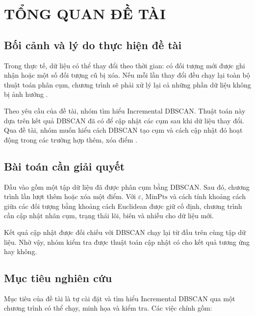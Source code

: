 \chapter{TỔNG QUAN ĐỀ TÀI}

\section{Bối cảnh và lý do thực hiện đề tài}

Trong thực tế, dữ liệu có thể thay đổi theo thời gian: có đối tượng mới được ghi nhận hoặc một số đối tượng cũ bị xóa. Nếu mỗi lần thay đổi đều chạy lại toàn bộ thuật toán phân cụm, chương trình sẽ phải xử lý lại cả những phần dữ liệu không bị ảnh hưởng \parencite{ester1998incrementaldbscan}.

Theo yêu cầu của đề tài, nhóm tìm hiểu Incremental DBSCAN. Thuật toán này dựa trên kết quả DBSCAN đã có để cập nhật các cụm sau khi dữ liệu thay đổi. Qua đề tài, nhóm muốn hiểu cách DBSCAN tạo cụm và cách cập nhật đó hoạt động trong các trường hợp thêm, xóa điểm \parencite{ester1998incrementaldbscan}.

\section{Bài toán cần giải quyết}

Đầu vào gồm một tập dữ liệu đã được phân cụm bằng DBSCAN. Sau đó, chương trình lần lượt thêm hoặc xóa một điểm. Với \(\varepsilon\), \(\mathrm{MinPts}\) và cách tính khoảng cách giữa các đối tượng bằng khoảng cách Euclidean được giữ cố định, chương trình cần cập nhật nhãn cụm, trạng thái lõi, biên và nhiễu cho dữ liệu mới.

Kết quả cập nhật được đối chiếu với DBSCAN chạy lại từ đầu trên cùng tập dữ liệu. Nhờ vậy, nhóm kiểm tra được thuật toán cập nhật có cho kết quả tương ứng hay không.

\section{Mục tiêu nghiên cứu}

Mục tiêu của đề tài là tự cài đặt và tìm hiểu Incremental DBSCAN qua một chương trình có thể chạy, minh họa và kiểm tra. Các việc chính gồm:

